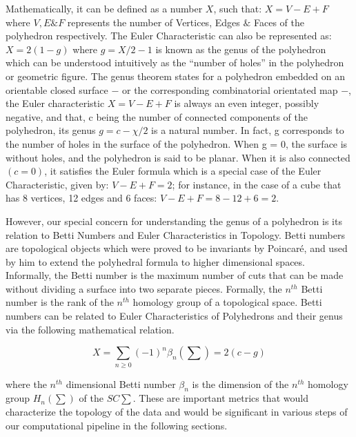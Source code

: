 Mathematically, it can be defined as a number $X$, such that: $X = V - E + F$ where $V, E \& F$ represents the number of Vertices, Edges $\&$ Faces of the polyhedron respectively. The Euler Characteristic can also be represented as: $X =2(1-g)$ where  $g= X/2-1$ is known as the genus  of the polyhedron \cite{17.2_TGTonlineBritanica} which can be understood intuitively as the “number of holes” in the polyhedron or geometric figure. The genus theorem states for a polyhedron embedded on an orientable closed surface − or the corresponding combinatorial orientated map −, the Euler characteristic  $X = V − E + F$ is always an even integer, possibly negative, and that, c being the number of connected components of the polyhedron, its genus $g = c − \chi/2$ is a natural number. In fact, g corresponds to the number of holes in the surface of the polyhedron. When g = 0, the surface is without holes, and the polyhedron is said to be planar. When it is also connected $(c = 0)$, it satisfies the Euler formula which is a special case of the Euler Characteristic, given by:  $V−E+F= 2$; for instance, in the case of a cube that has 8 vertices, 12 edges and 6 faces: $V−E + F=8-12+6=2$.\cite{03_1944Homology} \cite{01.18_EulerFormula}

However, our special concern for understanding the genus of a polyhedron is its relation to Betti Numbers and  Euler Characteristics in Topology. Betti numbers are topological objects which were proved to be invariants by Poincaré, and used by him to extend the polyhedral formula to higher dimensional spaces. Informally, the Betti number is the maximum number of cuts that can be made without dividing a surface into two separate pieces. Formally, the $n^{th}$ Betti number is the rank of the $n^{th}$ homology group of a topological space. Betti numbers can be related to Euler Characteristics of Polyhedrons and their genus via the following mathematical relation.\cite{03.7_2018homologicalAlgebra&Data} \cite{07.3_BettiNumber} \cite{07.2_TopoBettiNumbers}

\begin{equation}
  X=\sum_{n \ge 0}(−1)^{n}\beta_{n}(\sum)=2(c - g)
\end{equation}

where the $n^{th}$ dimensional Betti number $\beta_n$ is the dimension of the $n^{th}$ homology group $H_n(\sum)$ of the $SC \sum$. These are important metrics that would characterize the topology of the data and would be significant in various steps of our computational pipeline in the following sections.\cite{01.16_EulerianGraphs} \cite{01.18_EulerFormula} \cite{17.2_TGTonlineBritanica} \cite{03.2_2008FindingHomology} \cite{08.1_2003SimplicialHomology}



